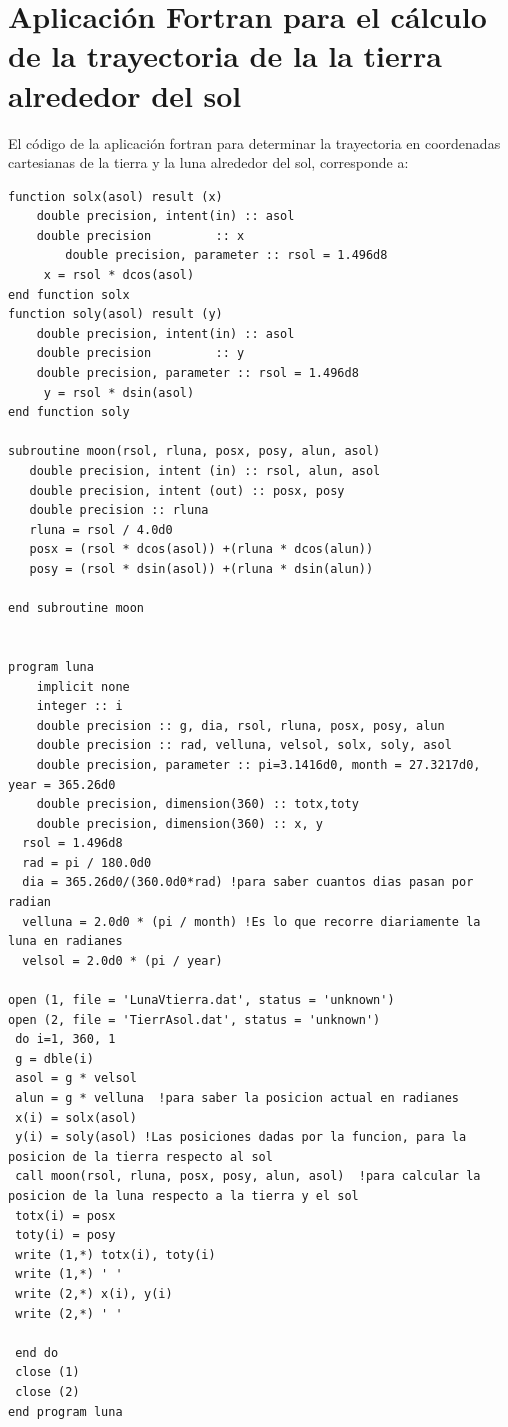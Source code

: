 \documentclass[12pt,a4paper,twoside]{article}
\begin{document}
\section{Aplicación Fortran para el cálculo de la trayectoria de la la tierra alrededor del sol}
El código de la aplicación fortran para determinar la trayectoria en coordenadas cartesianas de la tierra y la luna alrededor del sol, corresponde a:
\begin{verbatim}
function solx(asol) result (x)
	double precision, intent(in) :: asol
	double precision 	     :: x
        double precision, parameter :: rsol = 1.496d8
	 x = rsol * dcos(asol)
end function solx
function soly(asol) result (y)
	double precision, intent(in) :: asol
	double precision 	     :: y
	double precision, parameter :: rsol = 1.496d8
	 y = rsol * dsin(asol)
end function soly

subroutine moon(rsol, rluna, posx, posy, alun, asol)
   double precision, intent (in) :: rsol, alun, asol
   double precision, intent (out) :: posx, posy
   double precision :: rluna
   rluna = rsol / 4.0d0
   posx = (rsol * dcos(asol)) +(rluna * dcos(alun))
   posy = (rsol * dsin(asol)) +(rluna * dsin(alun))

end subroutine moon


program luna
	implicit none
	integer :: i
	double precision :: g, dia, rsol, rluna, posx, posy, alun
	double precision :: rad, velluna, velsol, solx, soly, asol
	double precision, parameter :: pi=3.1416d0, month = 27.3217d0, year = 365.26d0
	double precision, dimension(360) :: totx,toty
	double precision, dimension(360) :: x, y
  rsol = 1.496d8
  rad = pi / 180.0d0
  dia = 365.26d0/(360.0d0*rad) !para saber cuantos dias pasan por radian
  velluna = 2.0d0 * (pi / month) !Es lo que recorre diariamente la luna en radianes
  velsol = 2.0d0 * (pi / year)

open (1, file = 'LunaVtierra.dat', status = 'unknown')
open (2, file = 'TierrAsol.dat', status = 'unknown')
 do i=1, 360, 1
 g = dble(i)
 asol = g * velsol
 alun = g * velluna  !para saber la posicion actual en radianes
 x(i) = solx(asol)
 y(i) = soly(asol) !Las posiciones dadas por la funcion, para la posicion de la tierra respecto al sol
 call moon(rsol, rluna, posx, posy, alun, asol)  !para calcular la posicion de la luna respecto a la tierra y el sol
 totx(i) = posx
 toty(i) = posy
 write (1,*) totx(i), toty(i)
 write (1,*) ' '
 write (2,*) x(i), y(i)
 write (2,*) ' '

 end do
 close (1)
 close (2)
end program luna

\end{verbatim}
\end{document}
